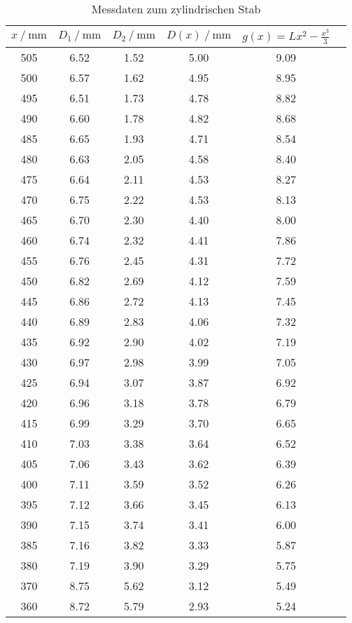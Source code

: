 \begin{table}
  \centering
  \caption{Messdaten zum zylindrischen Stab}
  \label{tab:Zylwerte}
  \begin{tabular}{c c c c c c}
    \toprule
      $x\:/\:\si{\milli\meter}$ & $D_1\:/\:\si{\milli\meter}$ & $D_2\:/\:\si{\milli\meter}$ & $D(x)\:/\:\si{\milli\meter}$ & $g(x)=Lx^2-\frac{x^3}{3}$ \\
    \midrule
    505 & 6.52 & 1.52 & 5.00 & 9.09 \\
    500 & 6.57 & 1.62 & 4.95 & 8.95 \\
    495 & 6.51 & 1.73 & 4.78 & 8.82 \\
    490 & 6.60 & 1.78 & 4.82 & 8.68 \\
    485 & 6.65 & 1.93 & 4.71 & 8.54 \\
    480 & 6.63 & 2.05 & 4.58 & 8.40 \\
    475 & 6.64 & 2.11 & 4.53 & 8.27 \\
    470 & 6.75 & 2.22 & 4.53 & 8.13 \\
    465 & 6.70 & 2.30 & 4.40 & 8.00 \\
    460 & 6.74 & 2.32 & 4.41 & 7.86 \\
    455 & 6.76 & 2.45 & 4.31 & 7.72 \\
    450 & 6.82 & 2.69 & 4.12 & 7.59 \\
    445 & 6.86 & 2.72 & 4.13 & 7.45 \\
    440 & 6.89 & 2.83 & 4.06 & 7.32 \\
    435 & 6.92 & 2.90 & 4.02 & 7.19 \\
    430 & 6.97 & 2.98 & 3.99 & 7.05 \\
    425 & 6.94 & 3.07 & 3.87 & 6.92 \\
    420 & 6.96 & 3.18 & 3.78 & 6.79 \\
    415 & 6.99 & 3.29 & 3.70 & 6.65 \\
    410 & 7.03 & 3.38 & 3.64 & 6.52 \\
    405 & 7.06 & 3.43 & 3.62 & 6.39 \\
    400 & 7.11 & 3.59 & 3.52 & 6.26 \\
    395 & 7.12 & 3.66 & 3.45 & 6.13 \\
    390 & 7.15 & 3.74 & 3.41 & 6.00 \\
    385 & 7.16 & 3.82 & 3.33 & 5.87 \\
    380 & 7.19 & 3.90 & 3.29 & 5.75 \\
    370 & 8.75 & 5.62 & 3.12 & 5.49 \\
    360 & 8.72 & 5.79 & 2.93 & 5.24 \\

\end{tabular}
\end{table}
